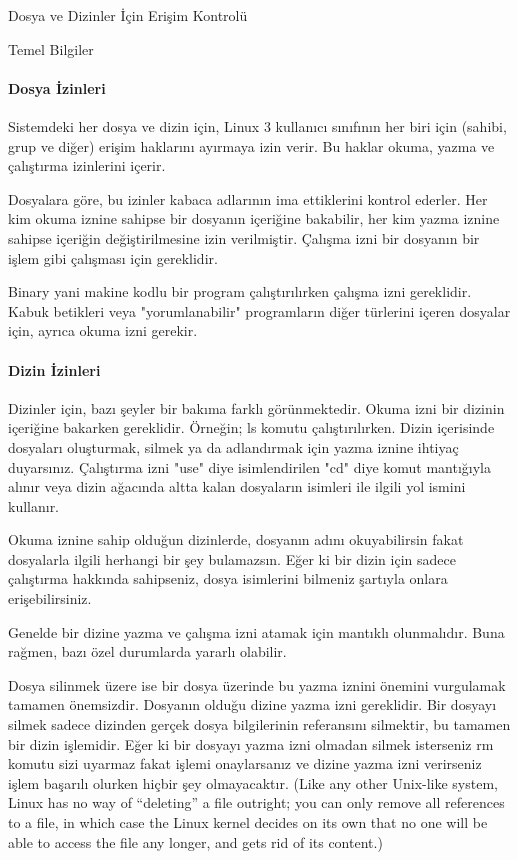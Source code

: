 \begin{section}{Dosya ve Dizinler İçin Erişim Kontrolü}
\begin{subsection}{Temel Bilgiler}
\paragraph{Dosya İzinleri}{Sistemdeki her dosya ve dizin için, Linux 3 kullanıcı sınıfının her biri için (sahibi, grup ve diğer) erişim haklarını ayırmaya izin verir. Bu haklar okuma, yazma ve çalıştırma izinlerini içerir.}

Dosyalara göre, bu izinler kabaca adlarının ima ettiklerini kontrol ederler. Her kim okuma iznine sahipse bir dosyanın içeriğine bakabilir, her kim yazma iznine sahipse içeriğin değiştirilmesine izin verilmiştir. Çalışma izni bir dosyanın bir işlem gibi çalışması için gereklidir.

Binary yani makine kodlu bir program çalıştırılırken çalışma izni gereklidir. Kabuk betikleri veya "yorumlanabilir" programların diğer türlerini içeren dosyalar için, ayrıca okuma izni gerekir.

\paragraph{Dizin İzinleri}{Dizinler için, bazı şeyler bir bakıma farklı görünmektedir. Okuma izni bir dizinin içeriğine bakarken gereklidir. Örneğin; ls komutu çalıştırılırken. Dizin içerisinde dosyaları oluşturmak, silmek ya da adlandırmak için yazma iznine ihtiyaç duyarsınız. Çalıştırma izni "use" diye isimlendirilen "cd" diye komut mantığıyla alınır veya dizin ağacında altta kalan dosyaların isimleri ile ilgili yol ismini kullanır.}

Okuma iznine sahip olduğun dizinlerde, dosyanın adını okuyabilirsin fakat dosyalarla ilgili herhangi bir şey bulamazsın. Eğer ki bir dizin için sadece çalıştırma hakkında sahipseniz, dosya isimlerini bilmeniz şartıyla onlara erişebilirsiniz.

Genelde bir dizine yazma ve çalışma izni atamak için mantıklı olunmalıdır. Buna rağmen, bazı özel durumlarda yararlı olabilir.

Dosya silinmek üzere ise bir dosya üzerinde bu yazma iznini önemini vurgulamak tamamen önemsizdir. Dosyanın olduğu dizine yazma izni gereklidir. Bir dosyayı silmek sadece dizinden gerçek dosya bilgilerinin referansını silmektir, bu tamamen bir dizin işlemidir. Eğer ki bir dosyayı yazma izni olmadan silmek isterseniz rm komutu sizi uyarmaz fakat işlemi onaylarsanız ve dizine yazma izni verirseniz işlem başarılı olurken hiçbir şey olmayacaktır. (Like any other Unix-like system, Linux has no way of “deleting” a file outright; you can only remove all references to a file, in which case the Linux kernel decides on its own that no one will be able to access the file any longer, and gets rid of its content.)


\end{subsection}
\end{section}
